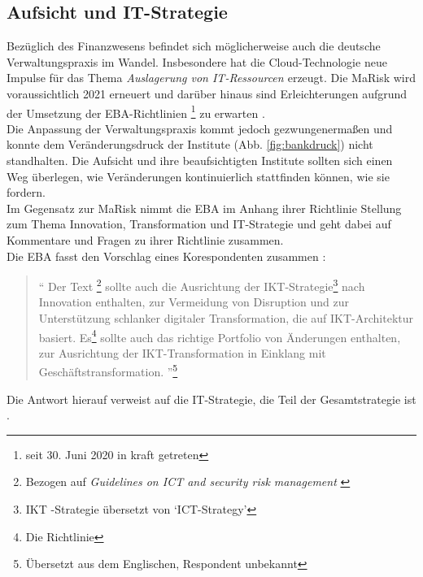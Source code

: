 \subsection{Aufsicht und IT-Strategie}
Bezüglich des Finanzwesens befindet sich möglicherweise auch die deutsche Verwaltungspraxis im Wandel. Insbesondere hat die Cloud-Technologie neue Impulse für das Thema \emph{Auslagerung von IT-Ressourcen \cite{MaRisk:2017, BAIT:2018}} erzeugt. Die \ac{MaRisk} wird voraussichtlich 2021 erneuert und darüber hinaus sind Erleichterungen aufgrund der Umsetzung der EBA-Richtlinien \cite{eba:2019}\footnote{seit 30. Juni 2020 in kraft getreten} zu erwarten \cite{BaFin:marisk-novelle}. 
\medskip
\\
Die Anpassung der Verwaltungspraxis kommt jedoch gezwungenermaßen und konnte dem Veränderungsdruck der Institute (Abb. \ref{fig:bankdruck}) nicht standhalten. Die Aufsicht und ihre beaufsichtigten Institute sollten sich einen Weg überlegen, wie Veränderungen kontinuierlich stattfinden können, wie sie \citet{Bussmann2006} fordern.
\medskip
\\
Im Gegensatz zur \ac{MaRisk} nimmt die \ac{EBA} im Anhang ihrer Richtlinie \cite{eba:2019} Stellung zum Thema Innovation, Transformation und IT-Strategie und geht dabei auf Kommentare und Fragen zu ihrer Richtlinie zusammen.
\medskip
\\
Die \ac{EBA} fasst den Vorschlag eines Korespondenten zusammen \cite[S. 50]{eba:2019}:
\begin{quote}
    \enquote{
Der Text
\footnote{Bezogen auf \emph{Guidelines on ICT and security risk
management
} \cite[S. 14ff]{eba:2019}} 
sollte auch die Ausrichtung der IKT-Strategie\footnote{\ac{IKT} -Strategie übersetzt von \enquote{ICT-Strategy}} nach Innovation enthalten, zur Vermeidung von Disruption und zur Unterstützung schlanker digitaler Transformation, die auf \ac{IKT}-Architektur basiert. Es\footnote{Die Richtlinie} sollte auch das richtige Portfolio von Änderungen enthalten, zur Ausrichtung der \ac{IKT}-Transformation in Einklang mit Geschäftstransformation.
    }\footnote{Übersetzt aus dem Englischen, Respondent unbekannt}
\end{quote}
Die Antwort hierauf verweist auf die IT-Strategie, die Teil der Gesamtstrategie ist \cite[S. 14ff]{eba:2019}.
\medskip
\\